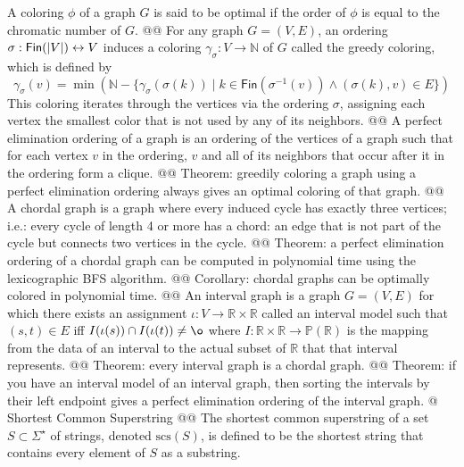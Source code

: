 \documentclass[]{article}
\DeclarePairedDelimiter{\abs}{\lvert}{\rvert}
\newcommand{\textbs}[1]{{\sffamily\fontseries{sbc}\selectfont #1}}
\newcommand{\mbb}[1]{\ensuremath{\mathbb{#1}}}     %
\newcommand{\mrm}[1]{\ensuremath{\mathrm{#1}}}     %
\newcommand{\msf}[1]{\ensuremath{\mathsf{#1}}}     %
\newcommand{\define}[1]{\textbs{#1}}
\begin{document}
\begin{easylist}[itemize]
{  A coloring $\phi$ of a graph $G$ is said to be \define{optimal} if the order
  of $\phi$ is equal to the chromatic number of $G$.
}
@@ {%
  For any graph $G = (V, E)$, an ordering
  $\sigma : \msf{Fin}(\abs{V}) \leftrightarrow V$
  induces a coloring $\gamma_\sigma : V \to \mbb{N}$ of $G$ called the
  \define{greedy coloring}, which is defined by
  \begin{equation*}
  \gamma_\sigma(v) = \min (\mbb{N} - \{ \gamma_\sigma(\sigma(k)) \mid k \in \msf{Fin}(\sigma^{-1}(v)) \wedge (\sigma(k), v) \in E \})
  \end{equation*}
  This coloring iterates through the vertices via the ordering $\sigma$,
  assigning each vertex the smallest color that is not used by any of its
  neighbors.
}
@@ {%
  A \define{perfect elimination ordering} of a graph is an ordering of the
  vertices of a graph such that for each vertex $v$ in the ordering, $v$ and all
  of its neighbors that occur after it in the ordering form a clique.
}
@@ {%
  Theorem: greedily coloring a graph using a perfect elimination ordering always
  gives an optimal coloring of that graph.
}
@@ {%
  A \define{chordal graph} is a graph where every induced cycle has exactly
  three vertices; i.e.: every cycle of length 4 or more has a \define{chord}: an
  edge that is not part of the cycle but connects two vertices in the cycle.
}
@@ {%
  Theorem: a perfect elimination ordering of a chordal graph can be computed in
  polynomial time using the \define{lexicographic BFS} algorithm.
}
@@ Corollary: chordal graphs can be optimally colored in polynomial time.
@@ {%
  An \define{interval graph} is a graph $G = (V, E)$ for which there exists an
  assignment $\iota : V \to \mbb{R} \times \mbb{R}$ called an
  \define{interval model} such that
  $(s, t) \in E$ iff $I(\iota(s)) \cap I(\iota(t)) \neq \o$
  where $I : \mbb{R} \times \mbb{R} \to \mbb{P}(\mbb{R})$
  is the mapping from the data of an interval to the actual subset
  of $\mbb{R}$ that that interval represents.
}
@@ Theorem: every interval graph is a chordal graph.
@@ {%
  Theorem: if you have an interval model of an interval graph, then sorting the
  intervals by their left endpoint gives a perfect elimination ordering of the
  interval graph.
}
@ Shortest Common Superstring
@@ {%
  The \define{shortest common superstring} of a set $S \subset \Sigma^{\star}$
  of strings, denoted $\mrm{scs}(S)$, is defined to be the shortest string
  that contains every element of $S$ as a substring.
}
\end{easylist}

\end{document}
